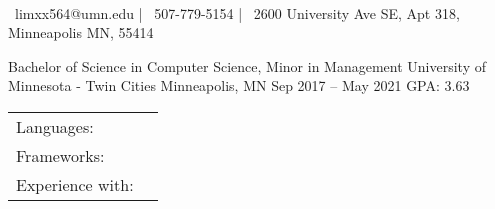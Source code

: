 \documentclass[]{awesome-cv}
\begin{document}
    
\begin{center}
	  \\
	\vspace{2mm}
	{\faEnvelope\ limxx564@umn.edu} | {\faMobile\ 507-779-5154} | {\faMapMarker\ 2600 University Ave SE, Apt 318, Minneapolis MN, 55414}
\end{center}
\begin{cventries}
	\cventry
	{Bachelor of Science in Computer Science, Minor in Management}
	{University of Minnesota - Twin Cities}
	{Minneapolis, MN}
	{Sep 2017 – May 2021}
	{GPA: 3.63}
\end{cventries}

\vspace{-2mm}
\begin{cventries}
	\cventry
	{}
	{\def\arraystretch{1.30}{\begin{tabular}{ l l }
		Languages:  & {\skill{ Python, Java, C++, C\#, OCaml, JavaScript, HTML/CSS, SQL (through frameworks)}} \\
		Frameworks:  & {\skill{ .NET Core, Vue.js, Quasar, Django, Google Tests, Click, MinGFX}} \\
		Experience with:  & {\skill{ Azure DevOps, Gitlab, AWS, Axios, OpenAPI, Processing, Ansible, Doxygen, LaTeX}}\\
		\end{tabular}}}
	{}
	{}
	{}
\end{cventries}
\end{document}
